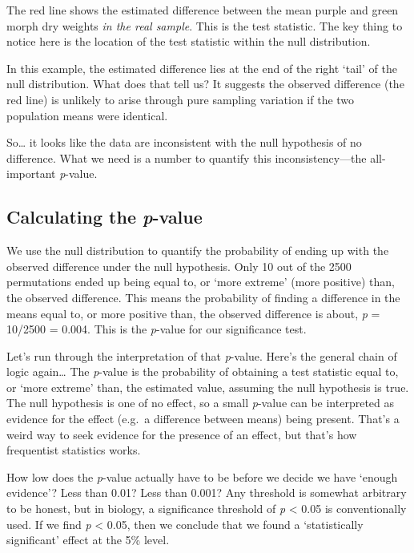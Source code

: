 \documentclass[
]{book}
\begin{document}
The red line shows the estimated difference between the mean purple and green morph dry weights \emph{in the real sample}. This is the test statistic. The key thing to notice here is the location of the test statistic within the null distribution.

In this example, the estimated difference lies at the end of the right `tail' of the null distribution. What does that tell us? It suggests the observed difference (the red line) is unlikely to arise through pure sampling variation if the two population means were identical.

So\ldots{} it looks like the data are inconsistent with the null hypothesis of no difference. What we need is a number to quantify this inconsistency---the all-important \emph{p}-value.

\hypertarget{calculating-the-p-value}{%
\subsection*{\texorpdfstring{Calculating the \emph{p}-value}{Calculating the p-value}}\label{calculating-the-p-value}}

We use the null distribution to quantify the probability of ending up with the observed difference under the null hypothesis. Only 10 out of the 2500 permutations ended up being equal to, or `more extreme' (more positive) than, the observed difference. This means the probability of finding a difference in the means equal to, or more positive than, the observed difference is about, \emph{p} = 10/2500 = 0.004. This is the \emph{p}-value for our significance test.

Let's run through the interpretation of that \emph{p}-value. Here's the general chain of logic again\ldots{} The \emph{p}-value is the probability of obtaining a test statistic equal to, or `more extreme' than, the estimated value, assuming the null hypothesis is true. The null hypothesis is one of no effect, so a small \emph{p}-value can be interpreted as evidence for the effect (e.g.~a difference between means) being present. That's a weird way to seek evidence for the presence of an effect, but that's how frequentist statistics works.

How low does the \emph{p}-value actually have to be before we decide we have `enough evidence'? Less than 0.01? Less than 0.001? Any threshold is somewhat arbitrary to be honest, but in biology, a significance threshold of \emph{p} \textless{} 0.05 is conventionally used. If we find \emph{p} \textless{} 0.05, then we conclude that we found a `statistically significant' effect at the 5\% level.
\end{document}
